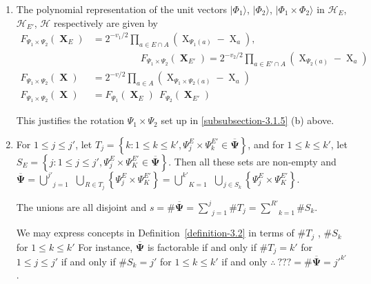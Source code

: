 \documentclass[a4paper,12pt]{article}
\DeclareMathOperator{\x}{\mathrm{X}}
\theoremstyle{definition}
\theoremstyle{underlinethm}
\theoremstyle{definition}
\begin{document}
\begin{enumerate}[label=(\alph*)]

\item The polynomial representation of the unit vectors $| \Phi_{1} \rangle$, $| \Phi_{2} \rangle$, $| \Phi_{1} \times \Phi_{2} \rangle$  in $\mathcal{H}_{E}$, $\mathcal{H}_{E'}$, $\mathcal{H}$ respectively are given by 
\begin{align*}
F_{\Psi_{1} \times \Psi_{2}} (\boldsymbol{\x}_{E}) & =  2^{-v_{1}/2} \prod_{a\in E \cap A}(\x_{\Psi_{1}(a)}- \x_{a}),~~\\
 &\qquad\qquad\quad F_{\Psi_{1} \times \Psi_{2}} (\boldsymbol{\x}_{E'})= 2^{-v_{2}/2} \prod_{a \in E' \cap A}(\x_{\Psi_{2}(a)}-\x_{a})\\
F_{\Psi_{1} \times \Psi_{2}} (\boldsymbol{\x}) &= 2^{-v/2} \prod_{a \in A} (\x_{\Psi_{1} \times \Psi_{2}(a)} - \x_{a})\\
F_{\Psi_{1} \times \Psi_{2}} (\boldsymbol{\x}) &= F_{\Psi_{1}} (\boldsymbol{\x}_{E})~~ F_{\Psi_{2}}(\boldsymbol{\x}_{E'})\tag{3.21}
\end{align*}

This justifies the rotation $\Psi_{1} \times \Psi_{2}$ set up in \ref{subsubsection-3.1.5} (b) above.

\item For $1 \leq j \leq j'$, let $T_{j} = \left\{k : 1 \leq k \leq k', \Psi_{j}^{E} \times \Psi_{k}^{E'} \in \overline{\boldsymbol{\Psi}}\right\}$, and for $1 \leq k \leq k'$, let $S_{E} = \left\{j : 1 \leq j \leq j', \Psi_{j}^{E} \times \Psi_{K}^{E'} \in  \overline{\boldsymbol{\Psi}}\right\}$. Then all these sets are non-empty  and $\overline{\boldsymbol{\Psi}} = \underset{j=1}{\overset{j'}{\bigcup}} ~~ \underset{R \in T_{j}}{\overset{}\bigcup} \left\{\Psi_{j}^{E} \times \Psi_{K}^{E'}\right\} = \underset{K=1}{\overset{k'}{\bigcup}}~~ \underset{j\in S_{k}}{\overset{}{\bigcup}}\left\{\Psi_{j}^{E} \times \Psi_{K}^{E'} \right\}$.

The unions are all disjoint and $s = \# \overline{\boldsymbol{\Psi}} = \underset{j=1}{\overset{j}{\sum}} \# T_{j} = \underset{k=1}{\overset{R'}{\sum}} \# S_{k}$.

We may express concepts in Definition~\ref{definition-3.2} in terms of $\# T_{j}$ , $\# S_{k}$ for $1 \leq k \leq k'$ For instance, $\overline{\boldsymbol{\Psi}}$ is factorable if and only if $\# T_{j} = k'$ for $1 \leq j \leq j'$ if and only if $\# S_{k} = j'$ for $1 \leq k \leq k'$ if and only $\therefore~ ??? = \# \overline{\boldsymbol{\Psi}} = j'^{k'}$.  


\end{enumerate}
\end{document}
